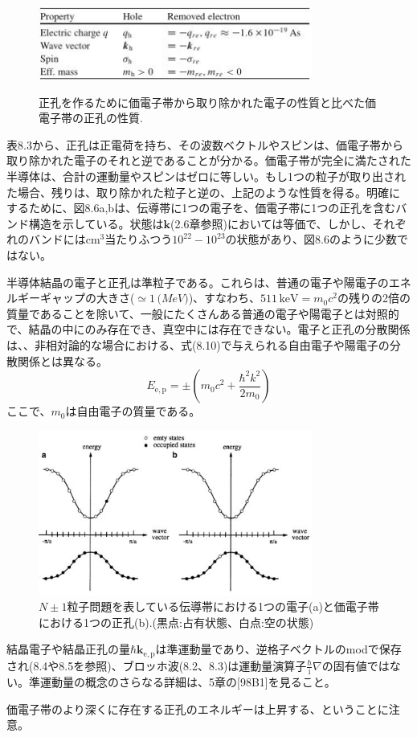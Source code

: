 \documentclass[11pt,a4j,uplatex]{jsarticle}
\begin{document}
\setcounter{figure}{2}
\begin{figure}[b]
  \centering
  \caption{正孔を作るために価電子帯から取り除かれた電子の性質と比べた価電子帯の正孔の性質.}
   \includegraphics[clip,width=9cm]{8_3.JPG}
  \label{table8.3}
\end{figure}

表8.3から、正孔は正電荷を持ち、その波数ベクトルやスピンは、価電子帯から取り除かれた電子のそれと逆であることが分かる。価電子帯が完全に満たされた半導体は、合計の運動量やスピンはゼロに等しい。もし1つの粒子が取り出された場合、残りは、取り除かれた粒子と逆の、上記のような性質を得る。明確にするために、図8.6a,bは、伝導帯に1つの電子を、価電子帯に1つの正孔を含むバンド構造を示している。状態は$\bm{k}$(2.6章参照)においては等価で、しかし、それぞれのバンドには$\mathrm{cm}^3$当たりふつう$10^{22}-10^{23}$の状態があり、図8.6のように少数ではない。

半導体結晶の電子と正孔は準粒子である。これらは、普通の電子や陽電子のエネルギーギャップの大きさ($\simeq1\,\mathrm(MeV)$)、すなわち、$511\,\mathrm{keV}=m_0c^2$の残りの2倍の質量であることを除いて、一般にたくさんある普通の電子や陽電子とは対照的で、結晶の中にのみ存在でき、真空中には存在できない。電子と正孔の分散関係は、、非相対論的な場合における、式(8.10)で与えられる自由電子や陽電子の分散関係とは異なる。
\begin{equation}
  E_{\mathrm{e,p}}=\pm\left(m_0c^2+\frac{\hbar^2k^2}{2m_0}\right)
  \tag{8.10}
\end{equation}
ここで、$m_0$は自由電子の質量である。

\renewcommand{\figurename}{図}%
\setcounter{figure}{5}
\begin{figure}[tb]
  \centering
  \includegraphics[clip,width=9cm]{8_6.JPG}
  \caption{$N\pm1$粒子問題を表している伝導帯における1つの電子(a)と価電子帯における1つの正孔(b).(黒点:占有状態、白点:空の状態)}
  \label{8.6}
\end{figure}

結晶電子や結晶正孔の量$\hbar\bm{k}_{\mathrm{e,p}}$は準運動量であり、逆格子ベクトルのmodで保存され(8.4や8.5を参照)、ブロッホ波(8.2、8.3)は運動量演算子$\frac{\hbar}{\mathrm{i}}\nabla$の固有値ではない。準運動量の概念のさらなる詳細は、5章の[98B1]を見ること。

価電子帯のより深くに存在する正孔のエネルギーは上昇する、ということに注意。
\end{document}
